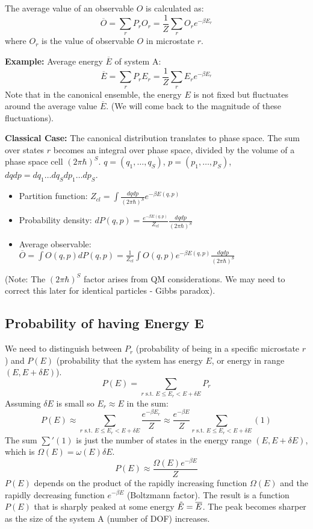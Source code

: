 \documentclass[11pt]{article}
\newcommand{\avg}[1]{\overline{#1}}
\newcommand{\tE}{\Tilde{E}}
\newcommand{\deltaE}{\delta E}
\begin{document}
The average value of an observable $O$ is calculated as:
\[ \avg{O} = \sum_r P_r O_r = \frac{1}{Z} \sum_r O_r e^{-\beta E_r} \]
where $O_r$ is the value of observable $O$ in microstate $r$.

\textbf{Example:} Average energy $\avg{E}$ of system A:
\[ \avg{E} = \sum_r P_r E_r = \frac{1}{Z} \sum_r E_r e^{-\beta E_r} \]
Note that in the canonical ensemble, the energy $E$ is not fixed but fluctuates around the average value $\avg{E}$. (We will come back to the magnitude of these fluctuations).

\textbf{Classical Case:}
The canonical distribution translates to phase space. The sum over states $r$ becomes an integral over phase space, divided by the volume of a phase space cell $(2\pi\hbar)^S$.
$q=(q_1, \dots, q_S)$, $p=(p_1, \dots, p_S)$, $dq dp = dq_1 \dots dq_S dp_1 \dots dp_S$.
\begin{itemize}
    \item Partition function: $Z_{cl} = \int \frac{dq dp}{(2\pi\hbar)^S} e^{-\beta E(q,p)}$
    \item Probability density: $dP(q,p) = \frac{e^{-\beta E(q,p)}}{Z_{cl}} \frac{dq dp}{(2\pi\hbar)^S}$
    \item Average observable: $\avg{O} = \int O(q,p) dP(q,p) = \frac{1}{Z_{cl}} \int O(q,p) e^{-\beta E(q,p)} \frac{dq dp}{(2\pi\hbar)^S}$
\end{itemize}
(Note: The $(2\pi\hbar)^S$ factor arises from QM considerations. We may need to correct this later for identical particles - Gibbs paradox).

\subsection*{Probability of having Energy E}

We need to distinguish between $P_r$ (probability of being in a specific microstate $r$) and $P(E)$ (probability that the system has energy $E$, or energy in range $(E, E+\deltaE)$).
\[ P(E) = \sum_{r \text{ s.t. } E \le E_r < E+\deltaE} P_r \]
Assuming $\deltaE$ is small so $E_r \approx E$ in the sum:
\[ P(E) \approx \sum_{r \text{ s.t. } E \le E_r < E+\deltaE} \frac{e^{-\beta E_r}}{Z} \approx \frac{e^{-\beta E}}{Z} \sum_{r \text{ s.t. } E \le E_r < E+\deltaE} (1) \]
The sum $\sum'(1)$ is just the number of states in the energy range $(E, E+\deltaE)$, which is $\Omega(E) = \omega(E)\deltaE$.
\[ P(E) \approx \frac{\Omega(E) e^{-\beta E}}{Z} \]
$P(E)$ depends on the product of the rapidly increasing function $\Omega(E)$ and the rapidly decreasing function $e^{-\beta E}$ (Boltzmann factor). The result is a function $P(E)$ that is sharply peaked at some energy $\tE = \avg{E}$. The peak becomes sharper as the size of the system A (number of DOF) increases.
\end{document}
